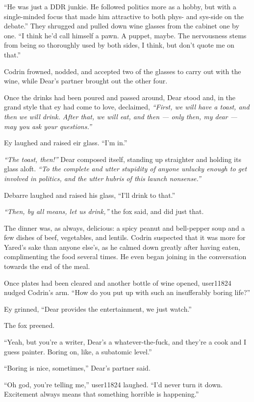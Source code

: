 ``He was just a DDR junkie. He followed politics more as a hobby, but with a single-minded focus that made him attractive to both phys- and sys-side on the debate.'' They shrugged and pulled down wine glasses from the cabinet one by one. ``I think he'd call himself a pawn. A puppet, maybe. The nervousness stems from being so thoroughly used by both sides, I think, but don't quote me on that.''

Codrin frowned, nodded, and accepted two of the glasses to carry out with the wine, while Dear's partner brought out the other four.

Once the drinks had been poured and passed around, Dear stood and, in the grand style that ey had come to love, declaimed, \emph{``First, we will have a toast, and then we will drink. After that, we will eat, and then — only then, my dear — may you ask your questions.''}

Ey laughed and raised eir glass. ``I'm in.''

\emph{``The toast, then!''} Dear composed itself, standing up straighter and holding its glass aloft. \emph{``To the complete and utter stupidity of anyone unlucky enough to get involved in politics, and the utter hubris of this launch nonsense.''}

Debarre laughed and raised his glass, ``I'll drink to that.''

\emph{``Then, by all means, let us drink,''} the fox said, and did just that.

The dinner was, as always, delicious: a spicy peanut and bell-pepper soup and a few dishes of beef, vegetables, and lentils. Codrin suspected that it was more for Yared's sake than anyone else's, as he calmed down greatly after having eaten, complimenting the food several times. He even began joining in the conversation towards the end of the meal.

Once plates had been cleared and another bottle of wine opened, user11824 nudged Codrin's arm. ``How do you put up with such an insufferably boring life?''

Ey grinned, ``Dear provides the entertainment, we just watch.''

The fox preened.

``Yeah, but you're a writer, Dear's a whatever-the-fuck, and they're a cook and I guess painter. Boring on, like, a subatomic level.''

``Boring is nice, sometimes,'' Dear's partner said.

``Oh god, you're telling me,'' user11824 laughed. ``I'd never turn it down. Excitement always means that something horrible is happening.''

